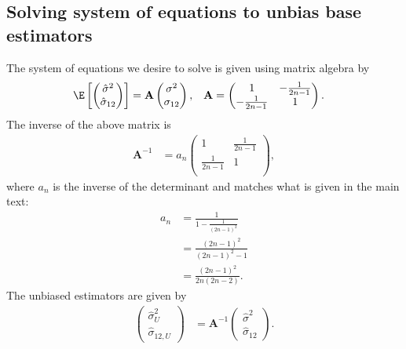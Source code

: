 \documentclass[11pt]{article}
\begin{document}
\subsection{Solving system of equations to unbias base estimators}

\label{sec:system}

The system of equations we desire to solve is given using matrix algebra by
\begin{align*}
  \E \left[
  \begin{pmatrix}
    \hat{\sigma}^2 \\
    \hat{\sigma}_{12}
  \end{pmatrix}
  \right]
  &=
    \mathbf{A}
    \begin{pmatrix}
      \sigma^2 \\
      \sigma_{12}
    \end{pmatrix}
    ,
  &
    \mathbf{A}
  &=
    \begin{pmatrix}
      1 & - \frac{1}{2n - 1} \\
      - \frac{1}{2n-1} & 1 \\
    \end{pmatrix}
    .
\end{align*}
The inverse of the above matrix is
\begin{align*}
  \mathbf{A}^{-1}
  &=
    a_n
    \begin{pmatrix}
      1 & \frac{1}{2n - 1} \\
      \frac{1}{2n-1} & 1 \\
    \end{pmatrix}
    ,
\end{align*}
where $a_n$ is the inverse of the determinant and matches what is given in the main text:
\begin{align*}
  a_n
  &=
    \frac{1}{1 - \frac{1}{(2n - 1)^2}}
  \\
  &=
    \frac{(2n - 1)^2}{(2n - 1)^2 - 1}
  \\
  &=
    \frac{(2n - 1)^2}{2n(2n - 2)}
    .
\end{align*}
The unbiased estimators are given by
\begin{align*}
  \begin{pmatrix}
    \hat{\sigma}^2_U \\
    \hat{\sigma}_{12,U}
  \end{pmatrix}
  &=
    \mathbf{A}^{-1}
    \begin{pmatrix}
      \hat{\sigma}^2 \\
      \hat{\sigma}_{12}
    \end{pmatrix}
    .
\end{align*}
\end{document}
